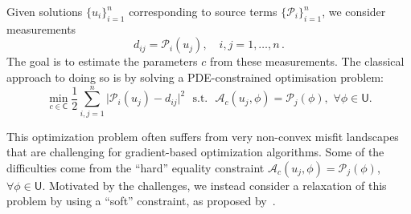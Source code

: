 \documentclass[12pt]{amsart}
\newcommand{\U}{\mathsf{U}}
\begin{document}
Given solutions $\{u_i\}_{i=1}^n$ corresponding to source terms $\{\mathcal{P}_i\}_{i=1}^n$, we consider measurements
\[
d_{ij} = \mathcal{P}_i(u_j),\quad i,j = 1,\ldots, n\,.
\]
The goal is to estimate the parameters $c$ from these measurements. The classical approach to doing so is by solving a PDE-constrained optimisation problem:
\begin{equation}\label{eq:FWI}
 \min_{c\in\mathsf{C}}  {\textstyle\frac{1}{2}} \sum_{i,j=1}^{n}   \big|\mathcal{P}_i(u_j) - d_{ij}\big|^2\,\,\,\,\text{s.t.}\,\,\,\,\mathcal{A}_c(u_j,\phi) = \mathcal{P}_j(\phi),\,\,\forall\phi\in \mathsf{U}.
 \end{equation}

This optimization problem often suffers from very non-convex misfit landscapes that are challenging for gradient-based optimization algorithms. Some of the difficulties come from the ``hard'' equality constraint $\mathcal{A}_c(u_j,\phi) = \mathcal{P}_j(\phi)$, $\forall \phi\in \U$. Motivated by the challenges, we instead consider a relaxation of this problem by using a ``soft'' constraint, as proposed by~\cite{van2015penalty}.
  
\end{document}
